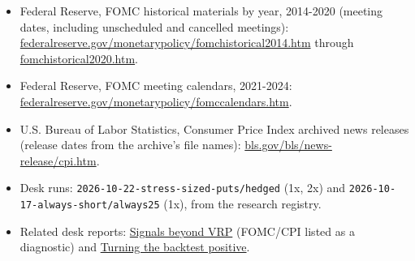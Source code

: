 \documentclass{article}
\begin{document}
\begin{itemize}

\item Federal Reserve, FOMC historical materials by year, 2014-2020 (meeting dates, including unscheduled and cancelled meetings): \href{https://www.federalreserve.gov/monetarypolicy/fomchistorical2014.htm}{federalreserve.gov/\allowbreak{}monetarypolicy/\allowbreak{}fomchistorical2014.htm} through \href{https://www.federalreserve.gov/monetarypolicy/fomchistorical2020.htm}{fomchistorical2020.htm}.

\item Federal Reserve, FOMC meeting calendars, 2021-2024: \href{https://www.federalreserve.gov/monetarypolicy/fomccalendars.htm}{federalreserve.gov/\allowbreak{}monetarypolicy/\allowbreak{}fomccalendars.htm}.

\item U.S. Bureau of Labor Statistics, Consumer Price Index archived news releases (release dates from the archive's file names): \href{https://www.bls.gov/bls/news-release/cpi.htm}{bls.gov/\allowbreak{}bls/\allowbreak{}news-release/\allowbreak{}cpi.htm}.

\item Desk runs: \texttt{2026-\allowbreak{}10-\allowbreak{}22-\allowbreak{}stress-\allowbreak{}sized-\allowbreak{}puts/\allowbreak{}hedged} (1x, 2x) and \texttt{2026-\allowbreak{}10-\allowbreak{}17-\allowbreak{}always-\allowbreak{}short/\allowbreak{}always25} (1x), from the research registry.

\item Related desk reports: \href{../strategy_research/2026-10-31-signals-beyond-vrp.pdf}{Signals beyond VRP} (FOMC/\allowbreak{}CPI listed as a diagnostic) and \href{2026-10-22-turning-the-backtest-positive.pdf}{Turning the backtest positive}.

\end{itemize}
\end{document}
